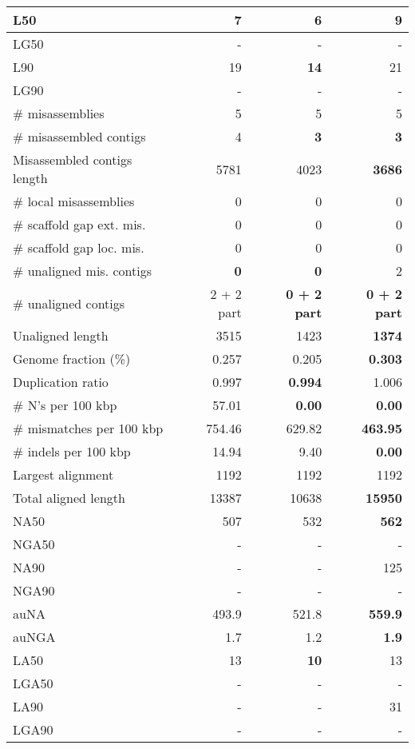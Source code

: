\documentclass[12pt,a4paper]{article}
\begin{document}
\begin{table}[ht]
\begin{center}
\begin{tabular}{|l*{3}{|r}|}
L50 & 7 & {\bf 6} & 9 \\ \hline
LG50 & - & - & - \\ \hline
L90 & 19 & {\bf 14} & 21 \\ \hline
LG90 & - & - & - \\ \hline
\# misassemblies & 5 & 5 & 5 \\ \hline
\# misassembled contigs & 4 & {\bf 3} & {\bf 3} \\ \hline
Misassembled contigs length & 5781 & 4023 & {\bf 3686} \\ \hline
\# local misassemblies & 0 & 0 & 0 \\ \hline
\# scaffold gap ext. mis. & 0 & 0 & 0 \\ \hline
\# scaffold gap loc. mis. & 0 & 0 & 0 \\ \hline
\# unaligned mis. contigs & {\bf 0} & {\bf 0} & 2 \\ \hline
\# unaligned contigs & 2 + 2 part & {\bf 0 + 2 part} & {\bf 0 + 2 part} \\ \hline
Unaligned length & 3515 & 1423 & {\bf 1374} \\ \hline
Genome fraction (\%) & 0.257 & 0.205 & {\bf 0.303} \\ \hline
Duplication ratio & 0.997 & {\bf 0.994} & 1.006 \\ \hline
\# N's per 100 kbp & 57.01 & {\bf 0.00} & {\bf 0.00} \\ \hline
\# mismatches per 100 kbp & 754.46 & 629.82 & {\bf 463.95} \\ \hline
\# indels per 100 kbp & 14.94 & 9.40 & {\bf 0.00} \\ \hline
Largest alignment & 1192 & 1192 & 1192 \\ \hline
Total aligned length & 13387 & 10638 & {\bf 15950} \\ \hline
NA50 & 507 & 532 & {\bf 562} \\ \hline
NGA50 & - & - & - \\ \hline
NA90 & - & - & 125 \\ \hline
NGA90 & - & - & - \\ \hline
auNA & 493.9 & 521.8 & {\bf 559.9} \\ \hline
auNGA & 1.7 & 1.2 & {\bf 1.9} \\ \hline
LA50 & 13 & {\bf 10} & 13 \\ \hline
LGA50 & - & - & - \\ \hline
LA90 & - & - & 31 \\ \hline
LGA90 & - & - & - \\ \hline
\end{tabular}
\end{center}
\end{table}
\end{document}
